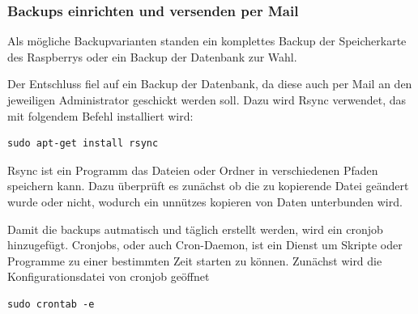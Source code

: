 \documentclass[11pt,a4paper]{article} %
\begin{document}
\subsubsection{Backups einrichten und versenden per Mail}
Als m\"ogliche Backupvarianten standen ein komplettes Backup der Speicherkarte des Raspberrys oder ein Backup der Datenbank zur Wahl.
\par
Der Entschluss fiel auf ein Backup der Datenbank, da diese auch per Mail an den jeweiligen Administrator geschickt werden soll. Dazu wird Rsync verwendet, das mit folgendem Befehl installiert wird:
\begin{frame}

\begin{lstlisting}
sudo apt-get install rsync
\end{lstlisting}
\end{frame}
 Rsync ist ein Programm das Dateien oder Ordner in verschiedenen Pfaden speichern kann. Dazu überprüft es zunächst ob die zu kopierende Datei geändert wurde oder nicht, wodurch ein unnützes kopieren von Daten unterbunden wird.
\par
Damit die backups autmatisch und täglich erstellt werden, wird ein cronjob hinzugefügt. Cronjobs, oder auch Cron-Daemon, ist ein Dienst um Skripte oder Programme zu einer bestimmten Zeit starten zu können. Zunächst wird die Konfigurationsdatei von cronjob geöffnet
\begin{frame}

\begin{lstlisting}
sudo crontab -e
\end{lstlisting}
\end{frame}
\end{document}
